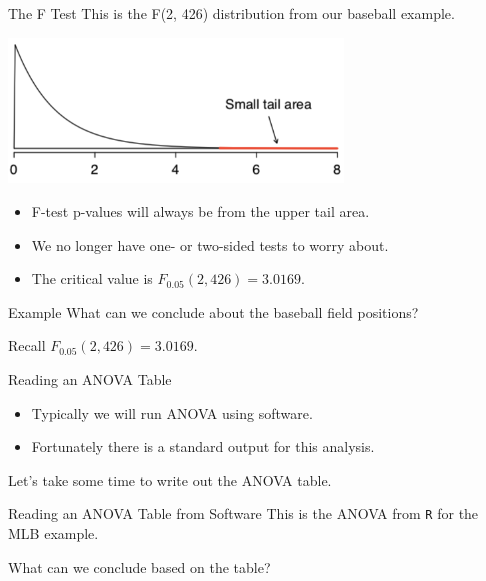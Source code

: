 \begin{frame}{The F Test}
    This is the F(2, 426) distribution from our baseball example.
    \begin{center}
        \includegraphics[width=3.5in]{images/fdistbaseball.png}
    \end{center}
    
    \begin{itemize}
        \item F-test p-values will always be from the upper tail area.
        \item We no longer have one- or two-sided tests to worry about.
        \item The critical value is $F_{0.05}(2, 426) = 3.0169$.
    \end{itemize}
\end{frame}

\begin{frame}{Example}
    What can we conclude about the baseball field positions?
    
    \vspace{12pt}Recall $F_{0.05}(2, 426) = 3.0169$.
\end{frame}

\begin{frame}{Reading an ANOVA Table}
    \begin{itemize}
        \item Typically we will run ANOVA using software.
        \item Fortunately there is a standard output for this analysis.
    \end{itemize}
    
    \vspace{12pt}Let's take some time to write out the ANOVA table.
\end{frame}

\begin{frame}{Reading an ANOVA Table from Software}
    This is the ANOVA from \texttt{R} for the MLB example. 
    \begin{table}[]
    \end{table}
    What can we conclude based on the table?
\end{frame}

